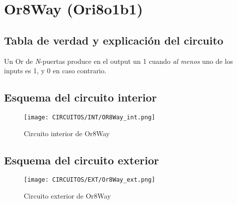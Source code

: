 \documentclass[12pt]{article}
\begin{document}
\section{Or8Way (Ori8o1b1)}
    \subsection{Tabla de verdad y explicación del circuito}
        Un Or de \textit{N}-puertas produce en el output un 1 cuando \textit{al menos} uno de los inputs es 1, y 0 en caso contrario. \cite{nisan_nand2tetris_2005}
        \begin{table}[H]
        \centering
        \caption{Tabla de verdad de Or8Way}
        \label{tab:tab_Or8way}
        \end{table}
        
    \subsection{Esquema del circuito interior}
        \begin{figure}[H]
            \centering
            \texttt{[image: CIRCUITOS/INT/OR8Way\_int.png]}            \caption{Circuito interior de Or8Way \cite{circuitverse}}
            \label{fig:or8way_int}
        \end{figure}
    \subsection{Esquema del circuito exterior}
        \begin{figure}[H]
            \centering
            \texttt{[image: CIRCUITOS/EXT/Or8Way\_ext.png]}            \caption{Circuito exterior de Or8Way \cite{circuitverse}}
            \label{fig:or8way_ext}
        \end{figure}
\end{document}
